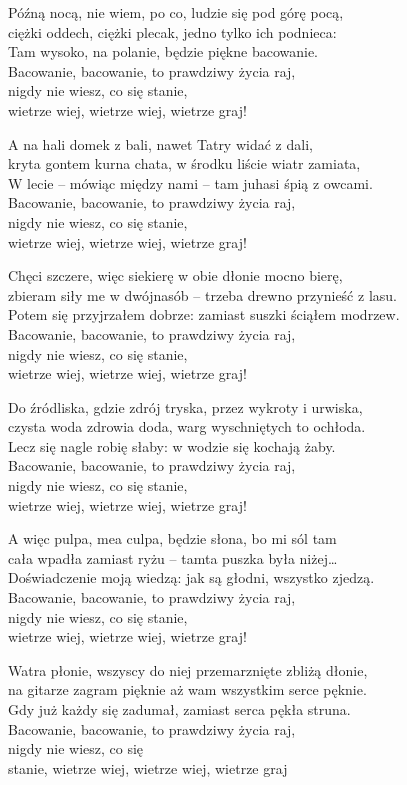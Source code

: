 \begin{text}
	Późną nocą, nie wiem, po co, ludzie się pod górę pocą,\\
	ciężki oddech, ciężki plecak, jedno tylko ich podnieca:\\
	Tam wysoko, na polanie, będzie piękne bacowanie.\\
	Bacowanie, bacowanie, to prawdziwy życia raj,\\
	nigdy nie wiesz, co się stanie,\\
	wietrze wiej, wietrze wiej, wietrze graj!

	A na hali domek z bali, nawet Tatry widać z dali,\\
	kryta gontem kurna chata, w środku liście wiatr zamiata,\\
	W lecie – mówiąc między nami – tam juhasi śpią z owcami.\\
	Bacowanie, bacowanie, to prawdziwy życia raj,\\
	nigdy nie wiesz, co się stanie,\\
    wietrze wiej, wietrze wiej, wietrze graj!

	Chęci szczere, więc siekierę w obie dłonie mocno bierę,\\
	zbieram siły me w dwójnasób – trzeba drewno przynieść z lasu.\\
	Potem się przyjrzałem dobrze: zamiast suszki ściąłem modrzew.\\
	Bacowanie, bacowanie, to prawdziwy życia raj,\\
	nigdy nie wiesz, co się stanie,\\ 
    wietrze wiej, wietrze wiej, wietrze graj!

	Do źródliska, gdzie zdrój tryska, przez wykroty i urwiska,\\
	czysta woda zdrowia doda, warg wyschniętych to ochłoda.\\
	Lecz się nagle robię słaby: w wodzie się kochają żaby.\\
	Bacowanie, bacowanie, to prawdziwy życia raj,\\
	nigdy nie wiesz, co się stanie,\\
    wietrze wiej, wietrze wiej, wietrze graj!

	A więc pulpa, mea culpa, będzie słona, bo mi sól tam\\
	cała wpadła zamiast ryżu – tamta puszka była niżej…\\
	Doświadczenie moją wiedzą: jak są głodni, wszystko zjedzą.\\
	Bacowanie, bacowanie, to prawdziwy życia raj,\\
	nigdy nie wiesz, co się stanie,\\ 
    wietrze wiej, wietrze wiej, wietrze graj!

	Watra płonie, wszyscy do niej przemarznięte zbliżą dłonie,\\
	na gitarze zagram pięknie aż wam wszystkim serce pęknie.\\
	Gdy już każdy się zadumał, zamiast serca pękła struna.\\
	Bacowanie, bacowanie, to prawdziwy życia raj,\\
    nigdy nie wiesz, co się\\
	stanie, wietrze wiej, wietrze wiej, wietrze graj   
\end{text}
